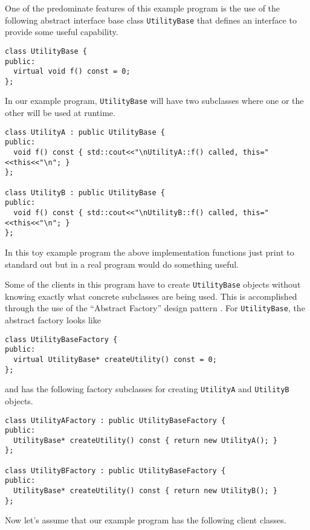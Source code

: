 \documentclass[pdf,ps2pdf,11pt]{SANDreport}
\begin{document}
One of the predominate features of this example program is the use of
the following abstract interface base class {}\texttt{Utility\-Base}
that defines an interface to provide some useful capability.

{\small\begin{verbatim}
class UtilityBase {
public:
  virtual void f() const = 0;
};
\end{verbatim}}

In our example program, {}\texttt{Utility\-Base} will have two
subclasses where one or the other will be used at runtime.

{\small\begin{verbatim}
class UtilityA : public UtilityBase {
public:
  void f() const { std::cout<<"\nUtilityA::f() called, this="<<this<<"\n"; }
};

class UtilityB : public UtilityBase {
public:
  void f() const { std::cout<<"\nUtilityB::f() called, this="<<this<<"\n"; }
};
\end{verbatim}}

{}\noindent{}In this toy example program the above implementation
functions just print to standard out but in a real program would do
something useful.

Some of the clients in this program have to create
{}\texttt{Utility\-Base} objects without knowing exactly what concrete
subclasses are being used.  This is accomplished through the use of
the ``Abstract Factory'' design pattern {}\cite{ref:gama_et_al_1995}.
For {}\texttt{Utility\-Base}, the abstract factory looks like

{\small\begin{verbatim}
class UtilityBaseFactory {
public:
  virtual UtilityBase* createUtility() const = 0;
};
\end{verbatim}}

{}\noindent{}and has the following factory subclasses for creating
{}\texttt{Utility\-A} and {}\texttt{Utility\-B} objects.

{\small\begin{verbatim}
class UtilityAFactory : public UtilityBaseFactory {
public:
  UtilityBase* createUtility() const { return new UtilityA(); }
};

class UtilityBFactory : public UtilityBaseFactory {
public:
  UtilityBase* createUtility() const { return new UtilityB(); }
};
\end{verbatim}}

Now let's assume that our example program has the following client
classes.
\end{document}
